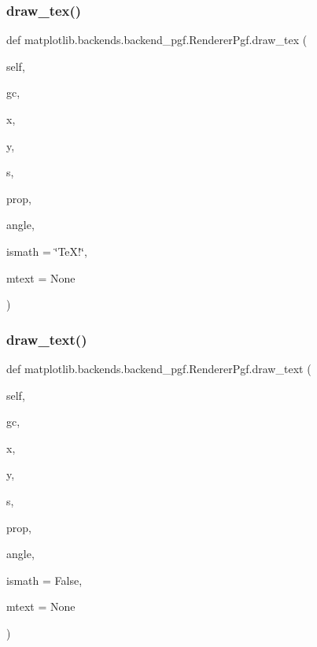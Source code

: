 \subsubsection{\texorpdfstring{draw\+\_\+tex()}{draw\_tex()}}
{\footnotesize\ttfamily def matplotlib.\+backends.\+backend\+\_\+pgf.\+Renderer\+Pgf.\+draw\+\_\+tex (\begin{DoxyParamCaption}\item[{}]{self,  }\item[{}]{gc,  }\item[{}]{x,  }\item[{}]{y,  }\item[{}]{s,  }\item[{}]{prop,  }\item[{}]{angle,  }\item[{}]{ismath = {\ttfamily \char`\"{}TeX!\char`\"{}},  }\item[{}]{mtext = {\ttfamily None} }\end{DoxyParamCaption})}

\mbox{\label{classmatplotlib_1_1backends_1_1backend__pgf_1_1RendererPgf_acb314f9cd208c195b87660462e78e318}} 
\subsubsection{\texorpdfstring{draw\+\_\+text()}{draw\_text()}}
{\footnotesize\ttfamily def matplotlib.\+backends.\+backend\+\_\+pgf.\+Renderer\+Pgf.\+draw\+\_\+text (\begin{DoxyParamCaption}\item[{}]{self,  }\item[{}]{gc,  }\item[{}]{x,  }\item[{}]{y,  }\item[{}]{s,  }\item[{}]{prop,  }\item[{}]{angle,  }\item[{}]{ismath = {\ttfamily False},  }\item[{}]{mtext = {\ttfamily None} }\end{DoxyParamCaption})}

